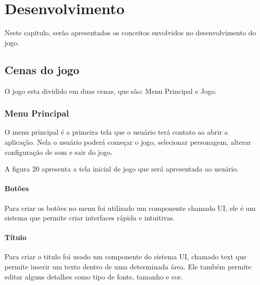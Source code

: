 \chapter{Desenvolvimento}
\label{cap:desenvolvimento}

Neste capitulo, serão apresentados os conceitos envolvidos no desenvolvimento do jogo.

\section{Cenas do jogo}
O jogo esta dividido em duas cenas, que são: Menu Principal e Jogo.

\subsection{Menu Principal}
O menu principal é a primeira tela que o usuário terá contato ao abrir a aplicação. Nela o usuário poderá começar o jogo, selecionar personagem, alterar configuração de som e sair do jogo.

A figura 20 apresenta a tela inicial de jogo que será apresentada ao usuário.

\begin{figure}[h!]
		\centering
	\end{figure}
	
\subsubsection{Botões}
Para criar os botões no menu foi utilizado um componente chamado UI, ele é um sistema que permite criar interfaces rápida e intuitivas. 

\subsubsection{Título }
Para criar o titulo foi usado um componente do sistema UI, chamado text que permite inserir um texto dentro de uma determinada área. Ele também permite editar alguns detalhes como tipo de fonte, tamanho e cor.


